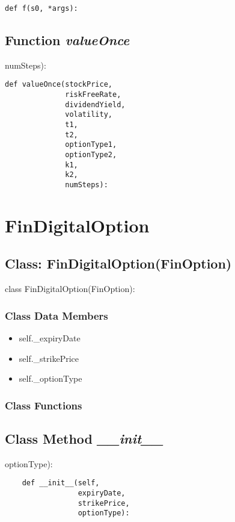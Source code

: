 \documentclass[twoside,11pt]{book}
\begin{document}
\begin{lstlisting}
def f(s0, *args):
\end{lstlisting}

\subsection{Function {\it valueOnce}}
numSteps):

\begin{lstlisting}
def valueOnce(stockPrice,
              riskFreeRate,
              dividendYield,
              volatility,
              t1,
              t2,
              optionType1,
              optionType2,
              k1,
              k2,
              numSteps):
\end{lstlisting}

\newpage
\section{FinDigitalOption}

\subsection{Class: FinDigitalOption(FinOption)}
class FinDigitalOption(FinOption):

\subsubsection{Class Data Members}
\begin{itemize}
\item{self.\_expiryDate}
\item{self.\_strikePrice}
\item{self.\_optionType}
\end{itemize}

\subsubsection{Class Functions}

\subsection{Class Method {\it \_\_init\_\_}}
optionType):

\begin{lstlisting}
    def __init__(self,
                 expiryDate,
                 strikePrice,
                 optionType):
\end{lstlisting}
\end{document}
